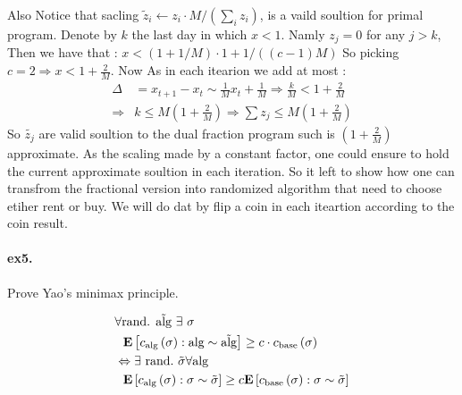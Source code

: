 \documentclass{article}
\begin{document}
\begin{multicols*}{2}
Also Notice that sacling $\tilde{z}_{i} \leftarrow z_{i} \cdot M / \left( \sum_{i}z_{i}  \right)$, is a vaild soultion for primal program. Denote by $k$ the last day in which  $x < 1$. Namly $z_{j} = 0 $ for any $j > k$, Then we have that :  $x < \left( 1 + 1/M  \right)\cdot 1 + 1 / \left( \left( c-1 \right)M \right) $ So picking $c = 2 \Rightarrow x < 1 + \frac{2}{M}$.
  Now As in each itearion we add at most : 
  \begin{equation*}
    \begin{split}
      \Delta  & = x_{t+1} - x_{t} \sim \frac{1}{M} x_{t} + \frac{1}{M} \Rightarrow \frac{k}{M} < 1+ \frac{2}{M} \\
      \Rightarrow & k \le M\left( 1 + \frac{2}{M} \right) \Rightarrow \sum{z_{j}}\le M\left( 1 + \frac{2}{M} \right)
    \end{split}
  \end{equation*}
So $\tilde{z_{j}}$ are valid soultion to the dual fraction program such is $ \left( 1 + \frac{2}{M} \right)$ approximate. As the scaling made by a constant factor, one could ensure to hold the current approximate soultion in each iteration.   
So it left to show how one can transfrom the fractional version into randomized algorithm that need to choose etiher rent or buy. We will do dat by flip a coin in each iteartion according to the coin result.  
  \paragraph{ex5.} Prove Yao's minimax principle. 

  \begin{equation*}
    \begin{split}
      & \forall \text{rand. } \tilde{\text{alg}} \  \exists  \ \sigma  \\
      & \ \ \dalg{ \calg\left( \sigma \right) } \ge c \cdot   \cbase\left( \sigma \right) \\  
      & \Leftrightarrow \exists \ \text{rand.} \ \tilde{\sigma} \forall \text{alg} \\  
      & \ \ \dsig{  \calg\left( \sigma \right)  } \ge c \dsig{ \cbase \left( \sigma \right)  } 
    \end{split}
  \end{equation*}

\end{multicols*}
\end{document}
